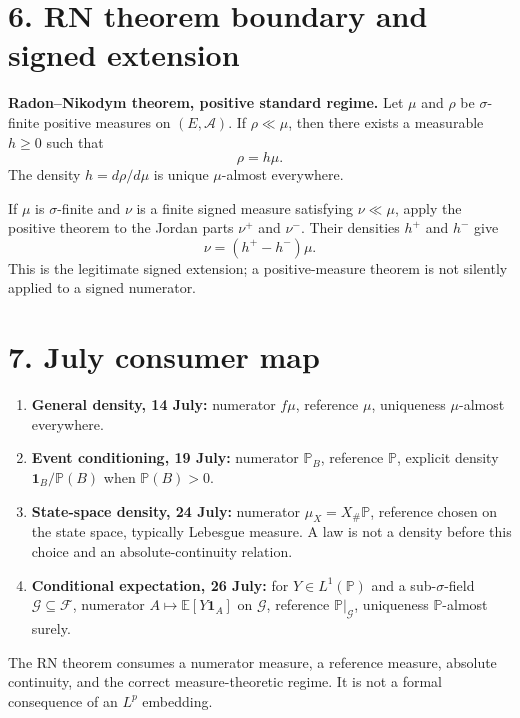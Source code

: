 \section*{6. RN theorem boundary and signed extension}

\textbf{Radon--Nikodym theorem, positive standard regime.}
Let $\mu$ and $\rho$ be $\sigma$-finite positive measures on $(E,\mathcal A)$. If $\rho\ll\mu$, then there exists a measurable $h\ge0$ such that
\[
\rho=h\mu.
\]
The density $h=d\rho/d\mu$ is unique $\mu$-almost everywhere.

If $\mu$ is $\sigma$-finite and $\nu$ is a finite signed measure satisfying $\nu\ll\mu$, apply the positive theorem to the Jordan parts $\nu^+$ and $\nu^-$. Their densities $h^+$ and $h^-$ give
\[
\nu=(h^+-h^-)\mu.
\]
This is the legitimate signed extension; a positive-measure theorem is not silently applied to a signed numerator.

\section*{7. July consumer map}

\begin{enumerate}
  \item \textbf{General density, 14 July:} numerator $f\mu$, reference $\mu$, uniqueness $\mu$-almost everywhere.
  \item \textbf{Event conditioning, 19 July:} numerator $\mathbb P_B$, reference $\mathbb P$, explicit density $\mathbf 1_B/\mathbb P(B)$ when $\mathbb P(B)>0$.
  \item \textbf{State-space density, 24 July:} numerator $\mu_X=X_\#\mathbb P$, reference chosen on the state space, typically Lebesgue measure. A law is not a density before this choice and an absolute-continuity relation.
  \item \textbf{Conditional expectation, 26 July:} for $Y\in L^1(\mathbb P)$ and a sub-$\sigma$-field $\mathcal G\subseteq\mathcal F$, numerator $A\mapsto\mathbb E[Y\mathbf 1_A]$ on $\mathcal G$, reference $\mathbb P|_{\mathcal G}$, uniqueness $\mathbb P$-almost surely.
\end{enumerate}

The RN theorem consumes a numerator measure, a reference measure, absolute continuity, and the correct measure-theoretic regime. It is not a formal consequence of an $L^p$ embedding.
